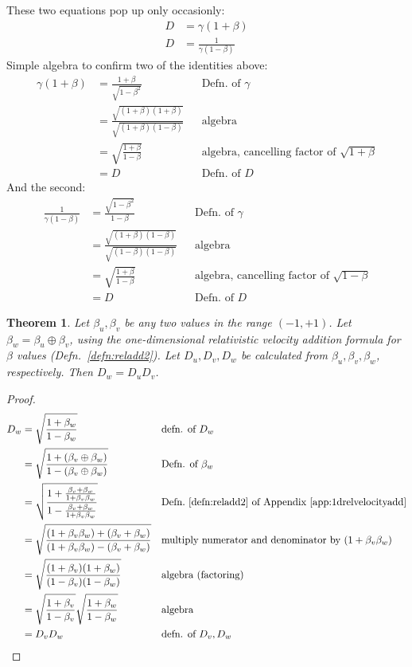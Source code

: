 \documentclass[a4paper]{article}
\theoremstyle{plain}
\newtheorem{theorem}{Theorem}
\theoremstyle{definition}
\begin{document}
These two equations pop up only occasionly:
\begin{align}
D & = \gamma (1+\beta) \label{eqn:Dgammabeta1} \\
D & = \frac{1}{\gamma (1-\beta)} \label{eqn:Dgammabeta2}
\end{align}
Simple algebra to confirm two of the identities above:
\begin{align*}
\gamma (1+\beta)
  & = \frac{1+\beta}{\sqrt{1-\beta^2}} & & \text{Defn. of $\gamma$} \\
  & = \frac{\sqrt{(1+\beta)(1+\beta)}}{\sqrt{(1+\beta)(1-\beta)}} & & \text{algebra} \\
  & = \sqrt{ \frac{1+\beta}{1-\beta} } & & \text{algebra, cancelling factor of $\sqrt{1+\beta}$} \\
  & = D & & \text{Defn. of $D$}
\end{align*}
And the second:
\begin{align*}
\frac{1}{\gamma (1-\beta)}
  & = \frac{\sqrt{1-\beta^2}}{1-\beta} & & \text{Defn. of $\gamma$} \\
  & = \frac{\sqrt{(1+\beta)(1-\beta)}}{\sqrt{(1-\beta)(1-\beta)}} & & \text{algebra} \\
  & = \sqrt{ \frac{1+\beta}{1-\beta} } & & \text{algebra, cancelling factor of $\sqrt{1-\beta}$} \\
  & = D & & \text{Defn. of $D$}
\end{align*}

\begin{theorem}
\label{thm:velAddLeadsToDopplerFProduct}
Let $\beta_u, \beta_v$ be any two values in the range $(-1, +1)$.
Let $\beta_w = \beta_u \oplus \beta_v$, using the one-dimensional
relativistic velocity addition formula for $\beta$ values
(Defn.~\eqref{defn:reladd2}).
Let $D_u, D_v, D_w$ be calculated from $\beta_u, \beta_v, \beta_w$,
respectively.
Then $D_w = D_u D_v$.
\end{theorem}

\begin{proof}
\begin{align*}
D_w & = \sqrt{ \frac{1+\beta_w}{1-\beta_w} } & & \text{defn. of $D_w$} \\
    & = \sqrt{ \frac{1+(\beta_v \oplus \beta_w)}{1-(\beta_v \oplus \beta_w)} } & & \text{Defn. of $\beta_w$} \\
    & = \sqrt{ \frac{1+\frac{\beta_v + \beta_w}{1 + \beta_v \beta_w}}{1-\frac{\beta_v + \beta_w}{1 + \beta_v \beta_w}} } & & \text{Defn.~\eqref{defn:reladd2} of Appendix~\ref{app:1drelvelocityadd}} \\
    & = \sqrt{ \frac{(1+\beta_v \beta_w)+(\beta_v + \beta_w)}{(1+\beta_v \beta_w)-(\beta_v + \beta_w)} } & & \text{multiply numerator and denominator by $(1+\beta_v \beta_w)$} \\
    & = \sqrt{ \frac{(1+\beta_v)(1+\beta_w)}{(1-\beta_v)(1-\beta_w)} } & & \text{algebra (factoring)} \\
    & = \sqrt{\frac{1+\beta_v}{1-\beta_v}} \sqrt{\frac{1+\beta_w}{1-\beta_w}} & & \text{algebra} \\
    & = D_v D_w & & \text{defn. of $D_v, D_w$}
\end{align*}
\end{proof}
\end{document}

